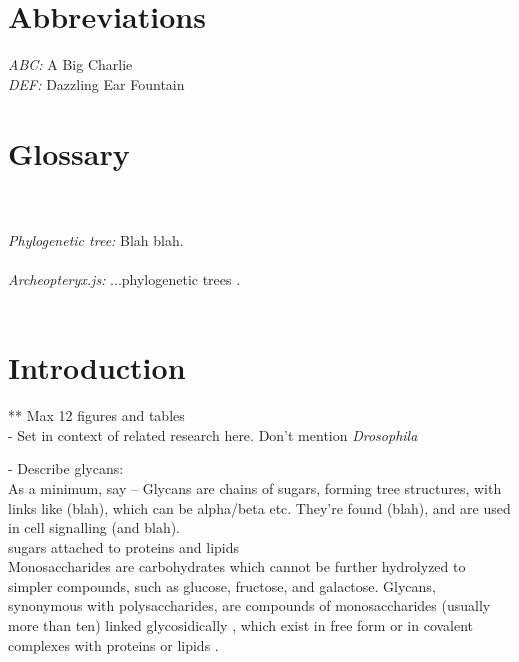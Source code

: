 \documentclass[12pt,a4paper]{article}
\begin{document}
\section*{Abbreviations}
\doublespacing
\textit{ABC:} A Big Charlie\\
\textit{DEF:} Dazzling Ear Fountain\\

\newpage
\section*{Glossary}
\label{sec:glossary}
\doublespacing
{}\\\\
\textit{Phylogenetic tree:} Blah blah.\\\\
\textit{Archeopteryx.js:} ...phylogenetic trees .\\\\













\newpage
\section{Introduction}
\label{sec:intro}

** Max 12 figures and tables\\

- Set in context of related research here. Don't mention \textit{Drosophila}



- Describe glycans:\\

As a minimum, say -- Glycans are chains of sugars, forming tree structures, with links like (blah), which can be alpha/beta etc. They're found (blah), and are used in cell signalling (and blah).\\

sugars attached to proteins and lipids \citep{10.1371/journal.pcbi.1002813}\\


Monosaccharides are carbohydrates which cannot be further hydrolyzed to simpler compounds, such as glucose, fructose, and galactose. Glycans, synonymous with polysaccharides, are compounds of monosaccharides (usually more than ten) linked glycosidically \citep{mcnaught1997compendium}, which exist in free form or in covalent complexes with proteins or lipids \citep{doi:10.1093/bioinformatics/btm090}.\\
\end{document}
